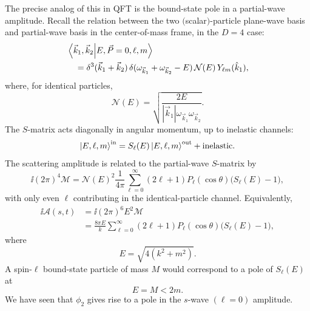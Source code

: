\begin{center}
\end{center}

The precise analog of this in QFT is the bound-state pole in a
partial-wave amplitude.  Recall the relation between the two
\((\)scalar\()\)-particle plane-wave basis and partial-wave basis in the
center-of-mass frame, in the \(D=4\) case:
\[
\begin{aligned}
  &\braket{\vec k_1,\vec k_2}{E,\vec P=0,\ell,m}
\\
  &\quad =
  \delta^3(\vec k_1+\vec k_2)\,
  \delta(\omega_{\vec k_1}+\omega_{\vec k_2}-E)\,
  \mathcal N(E)\,
  Y_{\ell m}(\hat k_1),
\end{aligned}
\]
where, for identical particles,
\[
  \mathcal N(E)
  =
  \sqrt{\frac{2E}{|\vec k_1|\omega_{\vec k_1}\omega_{\vec k_2}}}.
\]
The \(S\)-matrix acts diagonally in angular momentum, up to inelastic
channels:
\[
  \ket{E,\ell,m}^{\mathrm{in}}
  =
  S_\ell(E)\ket{E,\ell,m}^{\mathrm{out}}
  +\text{inelastic}.
\]
The scattering amplitude is related to the partial-wave \(S\)-matrix by
\[
  \ii(2\pi)^4\mathcal M
  =
  \mathcal N(E)^2\frac{1}{4\pi}
  \sum_{\ell=0}^{\infty}
  (2\ell+1)P_\ell(\cos\theta)\bigl(S_\ell(E)-1\bigr),
\]
with only even \(\ell\) contributing in the identical-particle channel.
Equivalently,
\[
\begin{aligned}
  \ii\mathcal A(s,t)
  &=
  \ii(2\pi)^6 E^2\mathcal M
\\
  &=
  \frac{8\pi E}{k}
  \sum_{\ell=0}^{\infty}
  (2\ell+1)P_\ell(\cos\theta)\bigl(S_\ell(E)-1\bigr),
\end{aligned}
\]
where
\[
  E=\sqrt{4(k^2+m^2)}.
\]
A spin-\(\ell\) bound-state particle of mass \(M\) would correspond to a
pole of \(S_\ell(E)\) at
\[
  E=M<2m.
\]
We have seen that \(\phi_2\) gives rise to a pole in the \(s\)-wave
\((\ell=0)\) amplitude.

